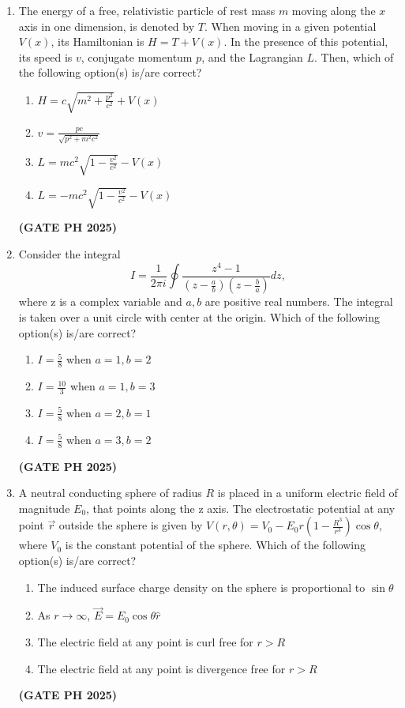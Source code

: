 \documentclass[14pt, a4paper]{extarticle}
\renewcommand{\vec}[1]{\overrightarrow{#1}}
\begin{document}
\begin{enumerate}[label=\textbf{Q.\arabic*}]
\item The energy of a free, relativistic particle of rest mass $m$ moving along the $x$ axis in one dimension, is denoted by $T$. When moving in a given potential $V(x)$, its Hamiltonian is $H = T + V(x)$. In the presence of this potential, its speed is $v$, conjugate momentum $p$, and the Lagrangian $L$. Then, which of the following option(s) is/are correct?
\begin{enumerate}
\item $H = c\sqrt{m^2 + \frac{p^2}{c^2}} + V(x)$
\item $v = \frac{pc}{\sqrt{p^2+m^2c^2}}$
\item $L = mc^2\sqrt{1-\frac{v^2}{c^2}} - V(x)$
\item $L = -mc^2\sqrt{1-\frac{v^2}{c^2}} - V(x)$
\end{enumerate}
\hfill \textbf{(GATE PH 2025)}

\item Consider the integral
$$ I = \frac{1}{2\pi i}\oint \frac{z^4-1}{\left(z-\frac{a}{b}\right)\left(z-\frac{b}{a}\right)}dz, $$
where z is a complex variable and $a, b$ are positive real numbers. The integral is taken over a unit circle with center at the origin. Which of the following option(s) is/are correct?
\begin{enumerate}
\item $I = \frac{5}{8}$ when $a=1, b=2$
\item $I = \frac{10}{3}$ when $a=1, b=3$
\item $I = \frac{5}{8}$ when $a=2, b=1$
\item $I = \frac{5}{8}$ when $a=3, b=2$
\end{enumerate}
\hfill \textbf{(GATE PH 2025)}

\item A neutral conducting sphere of radius $R$ is placed in a uniform electric field of magnitude $E_0$, that points along the z axis. The electrostatic potential at any point $\vec{r}$ outside the sphere is given by $V(r, \theta) = V_0 - E_0r\left(1-\frac{R^3}{r^3}\right)\cos\theta$, where $V_0$ is the constant potential of the sphere. Which of the following option(s) is/are correct?
\begin{enumerate}
\item The induced surface charge density on the sphere is proportional to $\sin\theta$
\item As $r \to \infty$, $\vec{E} = E_0\cos\theta\hat{r}$
\item The electric field at any point is curl free for $r > R$
\item The electric field at any point is divergence free for $r > R$
\end{enumerate}
\hfill \textbf{(GATE PH 2025)}


\end{enumerate}
\end{document}
